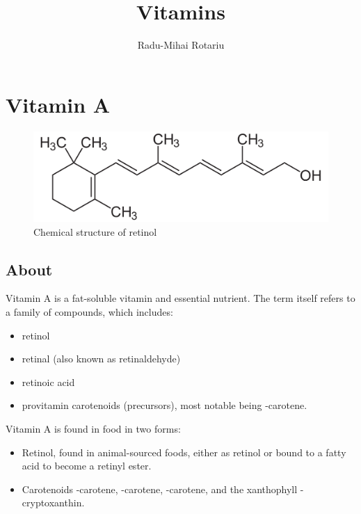 \documentclass{book}
\title{Vitamins}
\author{Radu-Mihai Rotariu}
\date{}
\begin{document}
\begin{titlepage}
\maketitle
\end{titlepage}

\tableofcontents
\newpage

\begin{sloppypar}

\chapter{Vitamin A}
\begin{figure}[h]
	\caption{Chemical structure of retinol}
	\centering \includegraphics[width=\textwidth]{images/Vitamin_A_chemical_structure}
\end{figure}
\newpage

\section{About}
Vitamin A is a fat-soluble vitamin and essential nutrient. The term itself refers to a family of compounds, which includes:
\begin{itemize}
	\item retinol
	\item retinal (also known as retinaldehyde)
	\item retinoic acid
	\item provitamin carotenoids (precursors), most notable being \textbeta-carotene.
\end{itemize}

Vitamin A is found in food in two forms:
\begin{itemize}
	\item Retinol, found in animal-sourced foods, either as retinol or bound to a fatty acid to become a retinyl ester.
	\item Carotenoids \textalpha-carotene, \textbeta-carotene, \textgamma-carotene, and the xanthophyll \textbeta-cryptoxanthin.
\end{itemize}


\end{sloppypar}
\end{document}
